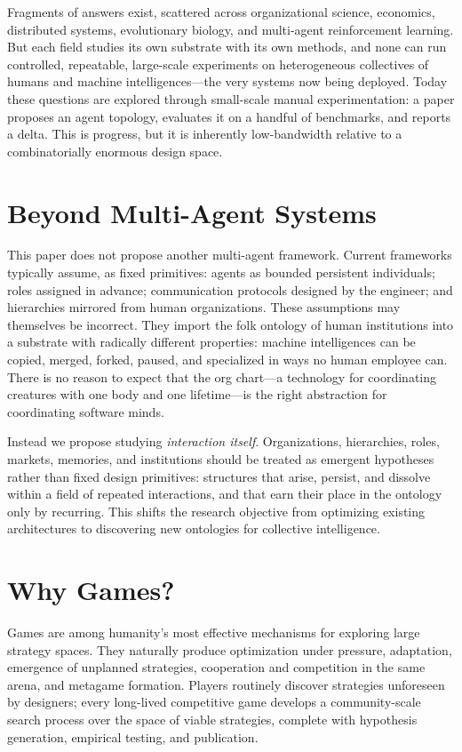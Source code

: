 \documentclass{article}
\begin{document}
Fragments of answers exist, scattered across organizational science, economics, distributed systems, evolutionary biology, and multi-agent reinforcement learning. But each field studies its own substrate with its own methods, and none can run controlled, repeatable, large-scale experiments on heterogeneous collectives of humans and machine intelligences---the very systems now being deployed. Today these questions are explored through small-scale manual experimentation: a paper proposes an agent topology, evaluates it on a handful of benchmarks, and reports a delta. This is progress, but it is inherently low-bandwidth relative to a combinatorially enormous design space.

\section{Beyond Multi-Agent Systems}

This paper does not propose another multi-agent framework. Current frameworks typically assume, as fixed primitives: agents as bounded persistent individuals; roles assigned in advance; communication protocols designed by the engineer; and hierarchies mirrored from human organizations. These assumptions may themselves be incorrect. They import the folk ontology of human institutions into a substrate with radically different properties: machine intelligences can be copied, merged, forked, paused, and specialized in ways no human employee can. There is no reason to expect that the org chart---a technology for coordinating creatures with one body and one lifetime---is the right abstraction for coordinating software minds.

Instead we propose studying \emph{interaction itself}. Organizations, hierarchies, roles, markets, memories, and institutions should be treated as emergent hypotheses rather than fixed design primitives: structures that arise, persist, and dissolve within a field of repeated interactions, and that earn their place in the ontology only by recurring. This shifts the research objective from optimizing existing architectures to discovering new ontologies for collective intelligence.

\section{Why Games?}

Games are among humanity's most effective mechanisms for exploring large strategy spaces. They naturally produce optimization under pressure, adaptation, emergence of unplanned strategies, cooperation and competition in the same arena, and metagame formation. Players routinely discover strategies unforeseen by designers; every long-lived competitive game develops a community-scale search process over the space of viable strategies, complete with hypothesis generation, empirical testing, and publication.
\end{document}
